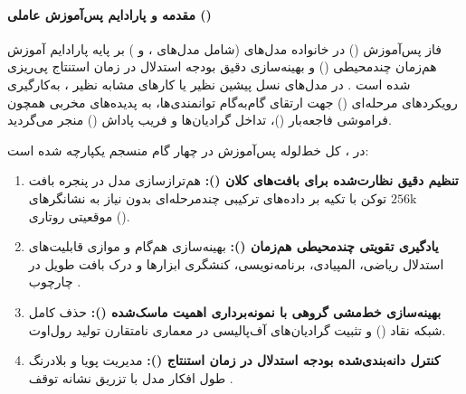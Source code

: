 \item {}

\paragraph*{مقدمه و پارادایم پس‌آموزش عاملی ()}
فاز پس‌آموزش () در خانواده مدل‌های  (شامل مدل‌های ،  و ) بر پایه پارادایم آموزش هم‌زمان چندمحیطی () و بهینه‌سازی دقیق بودجه استدلال در زمان استنتاج پی‌ریزی شده است \cite{nemotron3_2025}. در مدل‌های نسل پیشین نظیر  \cite{nemotron_nano2_2025} یا کارهای مشابه نظیر \cite{deepseek2025v32}، به‌کارگیری رویکردهای مرحله‌ای () جهت ارتقای گام‌به‌گام توانمندی‌ها، به پدیده‌های مخربی همچون فراموشی فاجعه‌بار ()، تداخل گرادیان‌ها و فریب پاداش () منجر می‌گردید. 

در ، کل خط‌لوله پس‌آموزش در چهار گام منسجم یکپارچه شده است:
\begin{enumerate}
    \item \textbf{تنظیم دقیق نظارت‌شده برای بافت‌های کلان ():} هم‌ترازسازی مدل در پنجره بافت $256\text{k}$ توکن با تکیه بر داده‌های ترکیبی چندمرحله‌ای بدون نیاز به نشانگرهای موقعیتی روتاری ().
    \item \textbf{یادگیری تقویتی چندمحیطی هم‌زمان ():} بهینه‌سازی هم‌گام و موازی قابلیت‌های استدلال ریاضی، المپیادی، برنامه‌نویسی، کنشگری ابزارها و درک بافت طویل در چارچوب .
    \item \textbf{بهینه‌سازی خط‌مشی گروهی با نمونه‌برداری اهمیت ماسک‌شده ():} حذف کامل شبکه نقاد () و تثبیت گرادیان‌های آف‌پالیسی در معماری نامتقارن تولید رول‌اوت.
    \item \textbf{کنترل دانه‌بندی‌شده بودجه استدلال در زمان استنتاج ():} مدیریت پویا و بلادرنگ طول افکار مدل با تزریق نشانه توقف .
\end{enumerate}

